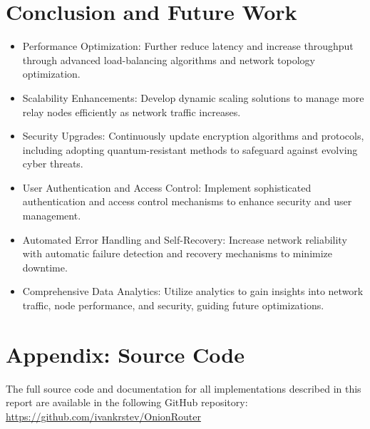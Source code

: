 \documentclass[sigconf]{acmart}
\begin{document}
\section{Conclusion and Future Work}
\begin{itemize}
    \item Performance Optimization: Further reduce latency and increase throughput through advanced load-balancing algorithms and network topology optimization.
    \item Scalability Enhancements: Develop dynamic scaling solutions to manage more relay nodes efficiently as network traffic increases.
    \item Security Upgrades: Continuously update encryption algorithms and protocols, including adopting quantum-resistant methods to safeguard against evolving cyber threats.
    \item User Authentication and Access Control: Implement sophisticated authentication and access control mechanisms to enhance security and user management.
    \item Automated Error Handling and Self-Recovery: Increase network reliability with automatic failure detection and recovery mechanisms to minimize downtime.
    \item Comprehensive Data Analytics: Utilize analytics to gain insights into network traffic, node performance, and security, guiding future optimizations.
\end{itemize}

\section{Appendix: Source Code}
The full source code and documentation for all implementations described in this report are available in the following GitHub repository: \url{https://github.com/ivankrstev/OnionRouter}
\end{document}
